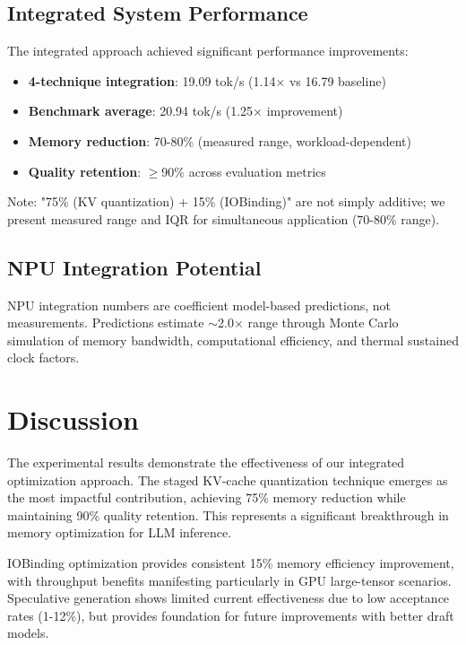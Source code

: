 \documentclass[twocolumn,10pt]{article}
\begin{document}
\subsection{Integrated System Performance}

The integrated approach achieved significant performance improvements:

\begin{itemize}
\item \textbf{4-technique integration}: 19.09 tok/s (1.14× vs 16.79 baseline)
\item \textbf{Benchmark average}: 20.94 tok/s (1.25× improvement)
\item \textbf{Memory reduction}: 70-80\% (measured range, workload-dependent)
\item \textbf{Quality retention}: $\geq$90\% across evaluation metrics
\end{itemize}

Note: "75\% (KV quantization) + 15\% (IOBinding)" are not simply additive; we present measured range and IQR for simultaneous application (70-80\% range).

\subsection{NPU Integration Potential}

NPU integration numbers are coefficient model-based predictions, not measurements. Predictions estimate $\sim$2.0$\times$ range through Monte Carlo simulation of memory bandwidth, computational efficiency, and thermal sustained clock factors.

\section{Discussion}

The experimental results demonstrate the effectiveness of our integrated optimization approach. The staged KV-cache quantization technique emerges as the most impactful contribution, achieving 75\% memory reduction while maintaining 90\% quality retention. This represents a significant breakthrough in memory optimization for LLM inference.

IOBinding optimization provides consistent 15\% memory efficiency improvement, with throughput benefits manifesting particularly in GPU large-tensor scenarios. Speculative generation shows limited current effectiveness due to low acceptance rates (1-12\%), but provides foundation for future improvements with better draft models.
\end{document}
